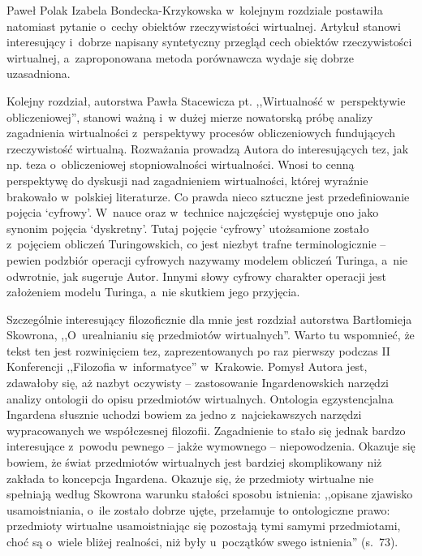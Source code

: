 \begin{recplenv}{Paweł Polak}
Izabela Bondecka-Krzykowska w~kolejnym rozdziale postawiła natomiast pytanie o~cechy obiektów rzeczywistości wirtualnej. Artykuł stanowi interesujący i~dobrze napisany syntetyczny przegląd cech obiektów rzeczywistości wirtualnej, a~zaproponowana metoda porównawcza wydaje się dobrze uzasadniona.

Kolejny rozdział, autorstwa Pawła Stacewicza pt. ,,Wirtualność w~perspektywie obliczeniowej'', stanowi ważną i~w dużej mierze nowatorską próbę analizy zagadnienia wirtualności z~perspektywy procesów obliczeniowych fundujących rzeczywistość wirtualną. Rozważania prowadzą Autora do interesujących tez, jak np. teza o~obliczeniowej stopniowalności wirtualności. Wnosi to cenną perspektywę do dyskusji nad zagadnieniem wirtualności, której wyraźnie brakowało w~polskiej literaturze. Co prawda nieco sztuczne jest przedefiniowanie pojęcia ‘cyfrowy'. W~nauce oraz w~technice najczęściej występuje ono jako synonim pojęcia ‘dyskretny'. Tutaj pojęcie ‘cyfrowy' utożsamione zostało z~pojęciem obliczeń Turingowskich, co jest niezbyt trafne terminologicznie -- pewien podzbiór operacji cyfrowych nazywamy modelem obliczeń Turinga, a~nie odwrotnie, jak sugeruje Autor. Innymi słowy cyfrowy charakter operacji jest założeniem modelu Turinga, a~nie skutkiem jego przyjęcia.

Szczególnie interesujący filozoficznie dla mnie jest rozdział autorstwa Bartłomieja Skowrona, ,,O~urealnianiu się przedmiotów wirtualnych''. Warto tu wspomnieć, że tekst ten jest rozwinięciem tez, zaprezentowanych po raz pierwszy podczas II Konferencji ,,Filozofia w~informatyce'' w~Krakowie. Pomysł Autora jest, zdawałoby się, aż nazbyt oczywisty -- zastosowanie Ingardenowskich narzędzi analizy ontologii do opisu przedmiotów wirtualnych. Ontologia egzystencjalna Ingardena słusznie uchodzi bowiem za jedno z~najciekawszych narzędzi wypracowanych we współczesnej filozofii. Zagadnienie to stało się jednak bardzo interesujące z~powodu pewnego -- jakże wymownego -- niepowodzenia. Okazuje się bowiem, że świat przedmiotów wirtualnych jest bardziej skomplikowany niż zakłada to koncepcja Ingardena. Okazuje się, że przedmioty wirtualne nie spełniają według Skowrona warunku stałości sposobu istnienia: ,,opisane zjawisko usamoistniania, o~ile zostało dobrze ujęte, przełamuje to ontologiczne prawo: przedmioty wirtualne usamoistniając się pozostają tymi samymi przedmiotami, choć są o~wiele bliżej realności, niż były u~początków swego istnienia'' (s.~73).


\end{recplenv}
